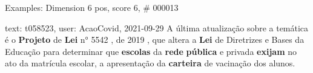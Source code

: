 \begin{frame}{Examples: Dimension 6 pos, score 6, \# 000013}
\footnotesize
\begin{exampleblock}{text: t058523, user: AcaoCovid, 2021-09-29}
A última atualização sobre a temática é o \textbf{Projeto} de \textbf{Lei} n° 
5542 , de 2019 , que altera a \textbf{Lei} de Diretrizes e Bases da Educação 
para determinar que \textbf{escolas} da \textbf{rede} \textbf{pública} e 
privada \textbf{exijam} no ato da matrícula escolar, a apresentação da 
\textbf{carteira} de vacinação dos alunos. 
\end{exampleblock}
\end{frame}
